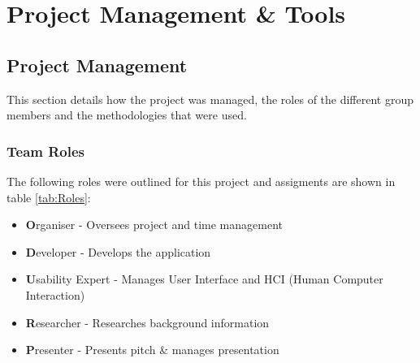 \section{Project Management \& Tools}

\subsection{Project Management}
This section details how the project was managed, the roles of the different group members and the methodologies that were used.

\subsubsection{Team Roles}
The following roles were outlined for this project and assigments are shown in table \ref{tab:Roles}:

\begin{itemize}[noitemsep,leftmargin=1cm]
	\item{\textbf{O}rganiser - Oversees project and time management}
	\item{\textbf{D}eveloper - Develops the application}
	\item{\textbf{U}sability Expert - Manages User Interface and HCI (Human Computer Interaction)}
	\item{\textbf{R}esearcher - Researches background information}
	\item{\textbf{P}resenter - Presents pitch \& manages presentation}
\end{itemize}

